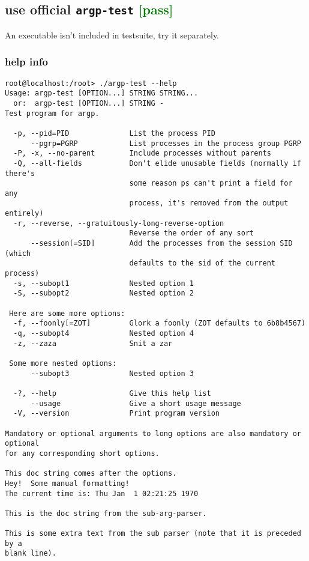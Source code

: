 \documentclass[a4paper]{report}
\begin{document}
\subsection{use official {\tt argp-test} \textcolor{green}{[pass]}}
An executable isn't included in testsuite, try it separately.\\
\subsubsection{help info}
\begin{lstlisting}
root@localhost:/root> ./argp-test --help
Usage: argp-test [OPTION...] STRING STRING...
  or:  argp-test [OPTION...] STRING -
Test program for argp.

  -p, --pid=PID              List the process PID
      --pgrp=PGRP            List processes in the process group PGRP
  -P, -x, --no-parent        Include processes without parents
  -Q, --all-fields           Don't elide unusable fields (normally if there's
                             some reason ps can't print a field for any
                             process, it's removed from the output entirely)
  -r, --reverse, --gratuitously-long-reverse-option
                             Reverse the order of any sort
      --session[=SID]        Add the processes from the session SID (which
                             defaults to the sid of the current process)
  -s, --subopt1              Nested option 1
  -S, --subopt2              Nested option 2

 Here are some more options:
  -f, --foonly[=ZOT]         Glork a foonly (ZOT defaults to 6b8b4567)
  -q, --subopt4              Nested option 4
  -z, --zaza                 Snit a zar

 Some more nested options:
      --subopt3              Nested option 3

  -?, --help                 Give this help list
      --usage                Give a short usage message
  -V, --version              Print program version

Mandatory or optional arguments to long options are also mandatory or optional
for any corresponding short options.

This doc string comes after the options.
Hey!  Some manual formatting!
The current time is: Thu Jan  1 02:21:25 1970

This is the doc string from the sub-arg-parser.

This is some extra text from the sub parser (note that it is preceded by a
blank line).
\end{lstlisting}\null\\
\end{document}
